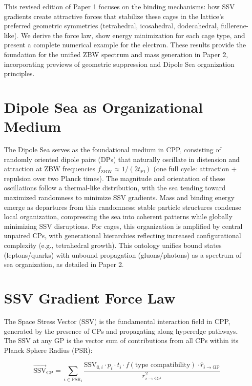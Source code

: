 \documentclass[11pt]{article}
\begin{document}
This revised edition of Paper 1 focuses on the binding mechanisms: how SSV gradients create attractive forces that stabilize these cages in the lattice’s preferred geometric symmetries (tetrahedral, icosahedral, dodecahedral, fullerene-like). We derive the force law, show energy minimization for each cage type, and present a complete numerical example for the electron. These results provide the foundation for the unified ZBW spectrum and mass generation in Paper 2, incorporating previews of geometric suppression and Dipole Sea organization principles.

\section{Dipole Sea as Organizational Medium}

The Dipole Sea serves as the foundational medium in CPP, consisting of randomly oriented dipole pairs (DPs) that naturally oscillate in distension and attraction at ZBW frequencies $f_{\text{ZBW}} \approx 1/(2 t_{\text{Pl}})$ (one full cycle: attraction + repulsion over two Planck times). The magnitude and orientation of these oscillations follow a thermal-like distribution, with the sea tending toward maximized randomness to minimize SSV gradients. Mass and binding energy emerge as departures from this randomness: stable particle structures condense local organization, compressing the sea into coherent patterns while globally minimizing SSV disruptions. For cages, this organization is amplified by central unpaired CPs, with generational hierarchies reflecting increased configurational complexity (e.g., tetrahedral growth). This ontology unifies bound states (leptons/quarks) with unbound propagation (gluons/photons) as a spectrum of sea organization, as detailed in Paper 2.

\section{SSV Gradient Force Law}

The Space Stress Vector (SSV) is the fundamental interaction field in CPP, generated by the presence of CPs and propagating along hyperedge pathways. The SSV at any GP is the vector sum of contributions from all CPs within its Planck Sphere Radius (PSR):

\begin{equation}
\vec{\text{SSV}}_{\text{GP}} = \sum_{i \in \text{PSR}_i} \frac{\text{SSV}_{0,i} \cdot p_i \cdot t_i \cdot f(\text{type compatibility}) \cdot \hat{r}_{i \to \text{GP}}}{r_{i \to \text{GP}}^2}
\label{eq:ssv_field}
\end{equation}
\end{document}
